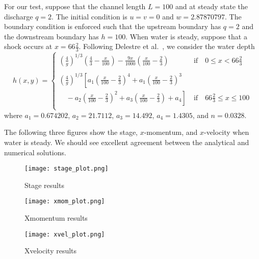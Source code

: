 For our test, suppose that the channel length $L = 100$ and at steady state the discharge $q = 2$. The initial condition is $u=v=0$ and $w=2.87870797$. The boundary condition is enforced such that the upstream boundary has $q=2$ and the downstream boundary has $h=100$. When water is steady, suppose that a shock occurs at $x=66\frac23$. Following Delestre et al.~\cite{Delestre-etal2012}, we consider the water depth
\begin{equation}
h(x,y)= \left\{ \begin{array}{ll}
       \left( \frac{4}{g}\right)^{1/3} 
       \left(\frac43 - \frac{x}{100}  \right) - \frac{9x}{1000} \left( \frac{x}{100} -\frac23 \right)
        & ~\textrm{if}\quad 0 \leq x < 66\frac23\\
        ~~ & ~~ \\
       \left( \frac{4}{g}\right)^{1/3}
       \left[ a_1\left( \frac{x}{100} -\frac23 \right)^4 +a_1\left(  \frac{x}{100} -\frac23 \right)^3 \right.\\
       \left. \quad -a_2 \left( \frac{x}{100} -\frac23 \right)^2 + a_3 \left( \frac{x}{100} -\frac23 \right) +a_4\right] 
       & ~\textrm{if}\quad 66\frac23 \leq x \leq 100\\
\end{array} \right.
\end{equation} 
where 
$a_1 = 0.674202$, 
$a_2 = 21.7112$, 
$a_3 = 14.492$, 
$a_4 = 1.4305$, and 
$n  = 0.0328$.


The following three figures show the stage, $x$-momentum, and $x$-velocity when water is steady. We should see excellent agreement between the analytical and numerical solutions.

\begin{figure}
\begin{center}
\texttt{[image: stage\_plot.png]}
\end{center}
\caption{Stage results}
\end{figure}


\begin{figure}
\begin{center}
\texttt{[image: xmom\_plot.png]}
\end{center}
\caption{Xmomentum results}
\end{figure}


\begin{figure}
\begin{center}
\texttt{[image: xvel\_plot.png]}
\end{center}
\caption{Xvelocity results}
\end{figure}


\endinput
